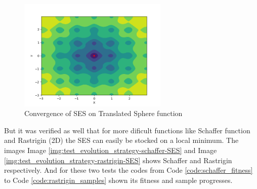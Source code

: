 



\begin{figure}
  \begin{center}
  \includegraphics[width=2.8in]{./../code/test_evolution_strategy_results/test_evolution_strategy-ackley-SES.png}
  \caption{Convergence of SES on Translated Sphere function}
  \label{img:test_evolution_strategy-ackley-SES}
  \end{center}
\end{figure}





But it was verified as well that for more dificult functions like Schaffer function and Rastrigin (2D) the SES can easily be stocked on a local minimum. The images Image \ref{img:test_evolution_strategy-schaffer-SES} and Image \ref{img:test_evolution_strategy-rastrigin-SES} shows Schaffer and Rastrigin respectively. And for these two tests the codes from Code \ref{code:schaffer_fitness} to Code \ref{code:rastrigin_samples} shown its fitness and sample progresses.

